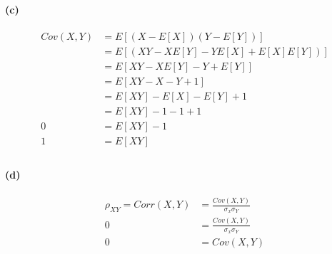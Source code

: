 \documentclass[10pt,letter]{article}
\begin{document}
\paragraph{(c)}
\begin{align*}
Cov(X,Y) &= E\left[ (X- E[X])(Y-E[Y]) \right]\\
&= E\left[ (XY- XE[Y] -YE[X] + E[X]E[Y]) \right]\\
&= E\left[ XY-XE[Y] -Y + E[Y] \right]\\
&= E\left[ XY-X -Y + 1 \right]\\
&= E[XY] -E[X]-E[Y] +1\\
&= E[XY] -1- 1 +1\\
0&= E[XY] -1\\
1&= E[XY]\\
\end{align*}

\paragraph{(d)}
\begin{align*}
\rho_{XY} = Corr(X,Y) &= \frac{Cov(X,Y)}{\sigma_x \sigma_{Y}} \\
0 &= \frac{Cov(X,Y)}{\sigma_x \sigma_{Y}} \\
0 &= Cov(X,Y)\\
\end{align*}
\end{document}
